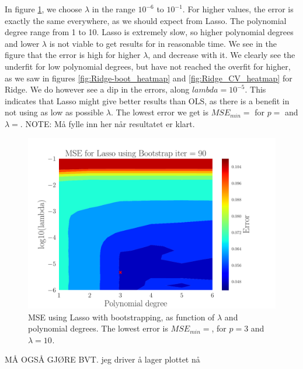 \documentclass[reprint,english,notitlepage,aps,nobalancelastpage,nofootinbib]{revtex4-1}  %
\begin{document}
In figure \ref{fig:Lasso_boot_heatmap}, we choose $\lambda$ in the range $10^{-6}$ to $10^{-1}$. For higher values, the error is exactly the same everywhere, as we should expect from Lasso. The polynomial degree range from 1 to 10. Lasso is extremely slow, so higher polynomial degrees and lower $\lambda$ is not viable to get results for in reasonable time. We see in the figure that the error is high for higher $\lambda$, and decrease with it. We clearly see the underfit for low polynomial degrees, but have not reached the overfit for higher, as we saw in figures \ref{fig:Ridge-boot_heatmap} and \ref{fig:Ridge_CV_heatmap} for Ridge. We do however see a dip in the errors, along $lambda=10^{-5}$. This indicates that Lasso might give better results than OLS, as there is a benefit in not using as low as possible $\lambda$. The lowest error we get is $MSE_{min}=$ for $p=$ and $\lambda=$. NOTE: Må fylle inn her når resultatet er klart.

\begin{figure}[h]
	\includegraphics[width=\linewidth]{Contour_PL_Lasso_Bootstrap90_n30_eps0.2_p1_6_lmbm1_m6.pdf}
	\caption{MSE using Lasso with bootstrapping, as function of $\lambda$ and polynomial degrees. The lowest error is $MSE_{min}=$, for $p=3$ and $\lambda = 10^{}$.}
	\label{fig:Lasso_boot_heatmap}
\end{figure}

MÅ OGSÅ GJØRE BVT. jeg driver å lager plottet nå
\end{document}
